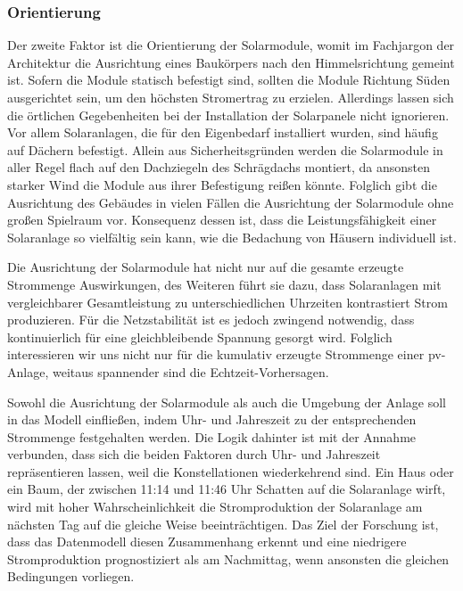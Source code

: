 \documentclass[12pt, a4paper]{article}
\begin{document}
\subsubsection{Orientierung}

Der zweite Faktor ist die Orientierung der Solarmodule, womit im Fachjargon der Architektur die Ausrichtung eines Baukörpers nach den Himmelsrichtung gemeint ist. Sofern die Module statisch befestigt sind, sollten die Module Richtung Süden ausgerichtet sein, um den höchsten Stromertrag zu erzielen. Allerdings lassen sich die örtlichen Gegebenheiten bei der Installation der Solarpanele nicht ignorieren. Vor allem Solaranlagen, die für den Eigenbedarf installiert wurden, sind häufig auf Dächern befestigt. Allein aus Sicherheitsgründen werden die Solarmodule in aller Regel flach auf den Dachziegeln des Schrägdachs montiert, da ansonsten starker Wind die Module aus ihrer Befestigung reißen könnte. Folglich gibt die Ausrichtung des Gebäudes in vielen Fällen die Ausrichtung der Solarmodule ohne großen Spielraum vor. Konsequenz dessen ist, dass die Leistungsfähigkeit einer Solaranlage so vielfältig sein kann, wie die Bedachung von Häusern individuell ist.

Die Ausrichtung der Solarmodule hat nicht nur auf die gesamte erzeugte Strommenge Auswirkungen, des Weiteren führt sie dazu, dass Solaranlagen mit vergleichbarer Gesamtleistung zu unterschiedlichen Uhrzeiten kontrastiert Strom produzieren. Für die Netzstabilität ist es jedoch zwingend notwendig, dass kontinuierlich für eine gleichbleibende Spannung gesorgt wird. Folglich interessieren wir uns nicht nur für die kumulativ erzeugte Strommenge einer \ac{pv}-Anlage, weitaus spannender sind die Echtzeit-Vorhersagen. 

Sowohl die Ausrichtung der Solarmodule als auch die Umgebung der Anlage soll in das Modell einfließen, indem Uhr- und Jahreszeit zu der entsprechenden Strommenge festgehalten werden. Die Logik dahinter ist mit der Annahme verbunden, dass sich die beiden Faktoren durch Uhr- und Jahreszeit repräsentieren lassen, weil die Konstellationen wiederkehrend sind. Ein Haus oder ein Baum, der zwischen 11:14 und 11:46 Uhr Schatten auf die Solaranlage wirft, wird mit hoher Wahrscheinlichkeit die Stromproduktion der Solaranlage am nächsten Tag auf die gleiche Weise beeinträchtigen. Das Ziel der Forschung ist, dass das Datenmodell diesen Zusammenhang erkennt und eine niedrigere Stromproduktion prognostiziert als am Nachmittag, wenn ansonsten die gleichen Bedingungen vorliegen.
\end{document}
